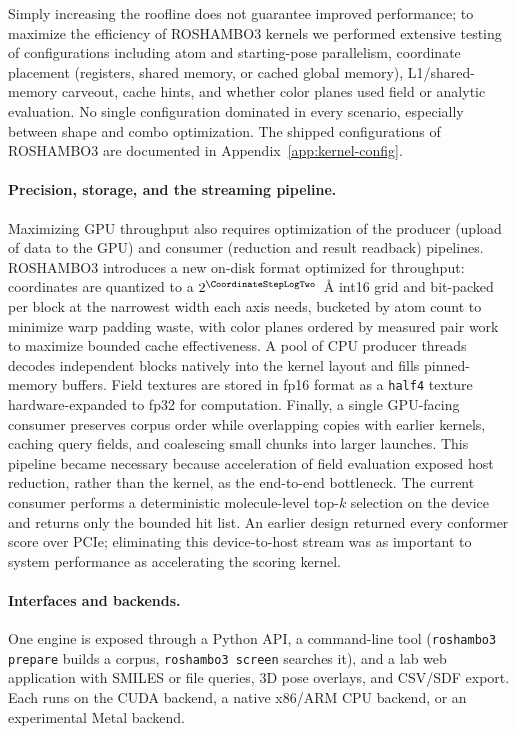 \documentclass{article}
\begin{document}
Simply increasing the roofline does not guarantee improved performance; to maximize the efficiency of ROSHAMBO3 kernels we performed extensive testing of configurations including atom and starting-pose parallelism, coordinate placement (registers, shared memory, or cached global memory), L1/shared-memory carveout, cache hints, and whether color planes used field or analytic evaluation. No single configuration dominated in every scenario, especially between shape and combo optimization. The shipped configurations of ROSHAMBO3 are documented in Appendix~\ref{app:kernel-config}.


\paragraph{Precision, storage, and the streaming pipeline.}
Maximizing GPU throughput also requires optimization of the producer (upload of data to the GPU) and consumer (reduction and result readback) pipelines. ROSHAMBO3 introduces a new on-disk format optimized for throughput: coordinates are quantized to a $2^{\CoordinateStepLogTwo}$~\AA{} int16 grid and bit-packed per block at the narrowest width each axis needs, bucketed by atom count to minimize warp padding waste, with color planes ordered by measured pair work to maximize bounded cache effectiveness.
A pool of CPU producer threads decodes independent blocks natively into the kernel layout and fills pinned-memory buffers. Field textures
 are stored in fp16 format as a \texttt{half4} texture hardware-expanded to fp32 for computation.
Finally, a single GPU-facing
consumer preserves corpus order while overlapping copies with earlier kernels,
caching query fields, and coalescing small chunks into larger launches. This
pipeline became necessary because acceleration of field evaluation exposed
host reduction, rather than the kernel, as the end-to-end bottleneck. The
current consumer performs a deterministic molecule-level top-$k$ selection on
the device and returns only the bounded hit list. An earlier design returned
every conformer score over PCIe; eliminating this device-to-host stream was
as important to system performance as accelerating the scoring
kernel.

\paragraph{Interfaces and backends.} One engine is exposed through a Python API,
a command-line tool (\texttt{roshambo3 prepare} builds a corpus,
\texttt{roshambo3 screen} searches it), and a lab web application with SMILES
or file queries, 3D pose overlays, and CSV/SDF export. Each runs on the CUDA
backend, a native x86/ARM CPU backend, or an experimental Metal backend.
\end{document}
